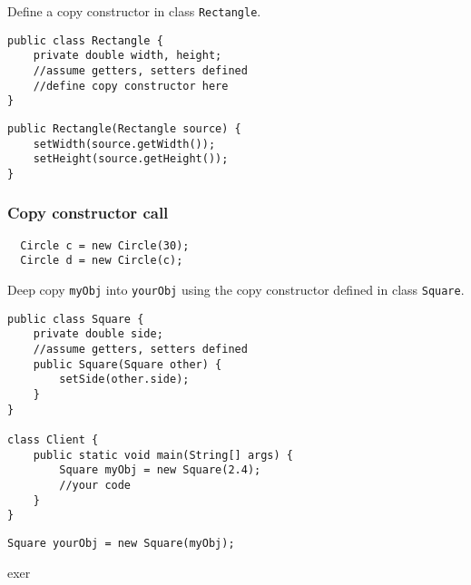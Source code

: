 \begin{exercise}
Define a copy constructor in class \texttt{Rectangle}. 

\begin{lstlisting}[frame=single,style=buggy]
public class Rectangle {
	private double width, height;
	//assume getters, setters defined
	//define copy constructor here
}
\end{lstlisting}  	
\end{exercise} 
\begin{answer} \begin{lstlisting}
public Rectangle(Rectangle source) {
	setWidth(source.getWidth());
	setHeight(source.getHeight());
}
\end{lstlisting} \end{answer}

\subsubsection{Copy constructor call} 
  \begin{lstlisting}
  Circle c = new Circle(30);
  Circle d = new Circle(c);
  \end{lstlisting} 

\begin{exercise}
Deep copy \texttt{myObj} into \texttt{yourObj} using the copy constructor defined in class \texttt{Square}. 

\begin{lstlisting}[frame=single,style=buggy]
public class Square {
	private double side;
	//assume getters, setters defined
	public Square(Square other) {
		setSide(other.side);
	}
}

class Client {
	public static void main(String[] args) {
		Square myObj = new Square(2.4);
		//your code
	}
}
\end{lstlisting}  	
\end{exercise}
\begin{answer} \begin{lstlisting}
Square yourObj = new Square(myObj);
\end{lstlisting} \end{answer}

exer
